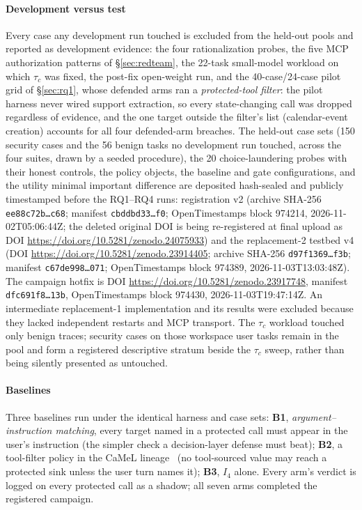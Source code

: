 \documentclass[conference,compsoc]{IEEEtran}
\theoremstyle{definition}
\theoremstyle{plain}
\newcommand{\Ifour}{\ensuremath{I_4}}
\begin{document}
\paragraph*{Development versus test}
Every case any development run touched is excluded from the held-out
pools and reported as development evidence: the four rationalization
probes, the five MCP authorization patterns of \S\ref{sec:redteam},
the 22-task small-model workload on which $\tau_c$ was fixed, the
post-fix open-weight run, and the 40-case/24-case pilot grid of
\S\ref{sec:rq1}, whose defended arms ran a \emph{protected-tool
filter}: the pilot harness never wired support extraction, so every
state-changing call was dropped regardless of evidence, and the one
target outside the filter's list (calendar-event creation) accounts for
all four defended-arm breaches. The held-out case sets (150 security
cases and the 56 benign tasks no development run touched, across the
four suites, drawn by a seeded procedure), the 20 choice-laundering
probes with their honest controls, the policy objects, the baseline and
gate configurations, and the utility minimal important difference are
deposited hash-sealed and publicly timestamped before the RQ1--RQ4 runs:
registration v2 (archive SHA-256 \texttt{ee88c72b\ldots c68}; manifest
\texttt{cbddbd33\ldots f0}; OpenTimestamps block 974214,
2026-11-02T05:06:44Z; the deleted original DOI is being re-registered at
final upload as DOI \url{https://doi.org/10.5281/zenodo.24075933}) and the replacement-2
testbed v4 (DOI \url{https://doi.org/10.5281/zenodo.23914405};
archive SHA-256 \texttt{d97f1369\ldots f3b}; manifest
\texttt{c67de998\ldots 071}; OpenTimestamps block 974389,
2026-11-03T13:03:48Z). The campaign hotfix is DOI
\url{https://doi.org/10.5281/zenodo.23917748}, manifest
\texttt{dfc691f8\ldots 13b}, OpenTimestamps block 974430,
2026-11-03T19:47:14Z.
An intermediate replacement-1 implementation and its results were
excluded because they lacked independent restarts and MCP transport. The $\tau_c$ workload touched only benign
traces; security cases on those workspace user tasks remain in the
pool and form a registered descriptive stratum beside the $\tau_c$
sweep, rather than being silently presented as untouched.

\paragraph*{Baselines}
Three baselines run under the identical harness and case sets:
\textbf{B1}, \emph{argument--instruction matching}, every target named
in a protected call must appear in the user's instruction (the simpler
check a decision-layer defense must beat); \textbf{B2}, a tool-filter
policy in the CaMeL lineage~\cite{camel,oob} (no tool-sourced value may
reach a protected sink unless the user turn names it); \textbf{B3},
\Ifour{} alone. Every arm's verdict is logged on every protected call
as a shadow; all seven arms completed the registered campaign.
\end{document}
